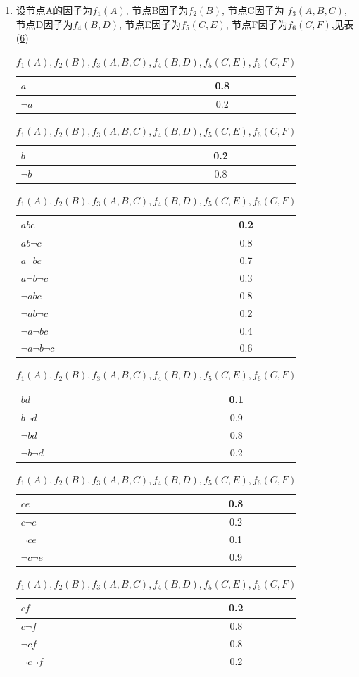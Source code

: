 \documentclass[a4paper, 11pt]{article}
\begin{document}
\begin{enumerate}
  \item
  设节点A的因子为$f_{1}(A)$, 节点B因子为$f_{2}(B)$, 节点C因子为
  $f_{3}(A,B,C)$, 节点D因子为$f_{4}(B,D)$, 节点E因子为$f_{5}(C,E)$,
  节点F因子为$f_{6}(C,F)$,见表(\ref{Q3T2.1})\\
  \begin{table}[ht]
    \centering
    \begin{tabular}{|l|c|}
      \hline
      $a$&0.8\\
      \hline
      $\lnot a$&0.2\\
      \hline
    \end{tabular}
    \begin{tabular}{|l|c|}
      \hline
      $b$&0.2\\
      \hline
      $\lnot b$&0.8\\
      \hline
    \end{tabular}
    \begin{tabular}{|l|c|}
      \hline
      $abc$&0.2\\
      \hline
      $ab\lnot c$&0.8\\
      \hline
      $a\lnot bc$&0.7\\
      \hline
      $a\lnot b \lnot c$&0.3\\
      \hline
      $\lnot abc$&0.8\\
      \hline
      $\lnot ab\lnot c$&0.2\\
      \hline
      $\lnot a \lnot bc$&0.4\\
      \hline
      $\lnot a \lnot b \lnot c$&0.6\\
      \hline
    \end{tabular}
    \begin{tabular}{|l|c|}
      \hline
      $bd$&0.1\\
      \hline
      $b\lnot d$&0.9\\
      \hline
      $\lnot bd$&0.8\\
      \hline
      $\lnot b\lnot d$&0.2\\
      \hline
    \end{tabular}
    \begin{tabular}{|l|c|}
      \hline
      $ce$&0.8\\
      \hline
      $c\lnot e$&0.2\\
      \hline
      $\lnot ce$&0.1\\
      \hline
      $\lnot c\lnot e$&0.9\\
      \hline
    \end{tabular}
    \begin{tabular}{|l|c|}
      \hline
      $cf$&0.2\\
      \hline
      $c\lnot f$&0.8\\
      \hline
      $\lnot cf$&0.8\\
      \hline
      $\lnot c\lnot f$&0.2\\
      \hline
    \end{tabular}
    \caption{$f_{1}(A),f_{2}(B),f_{3}(A,B,C),f_{4}(B,D),f_{5}(C,E),f_{6}(C,F)$}
    \label{Q3T2.1}
  \end{table}


\end{enumerate}
\end{document}
